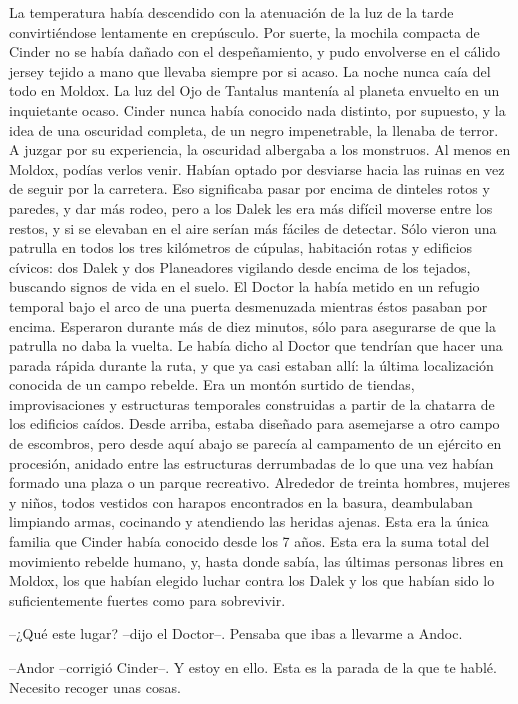 La temperatura había descendido con la atenuación de la luz de la tarde convirtiéndose lentamente en crepúsculo. Por suerte, la mochila compacta de Cinder no se había dañado con el despeñamiento, y pudo envolverse en el cálido jersey tejido a mano que llevaba siempre por si acaso.
La noche nunca caía del todo en Moldox. La luz del Ojo de Tantalus mantenía al planeta envuelto en un inquietante ocaso. Cinder nunca había conocido nada distinto, por supuesto, y la idea de una oscuridad completa, de un negro impenetrable, la llenaba de terror. A juzgar por su experiencia, la oscuridad albergaba a los monstruos. Al menos en Moldox, podías verlos venir.
Habían optado por desviarse hacia las ruinas en vez de seguir por la carretera. Eso significaba pasar por encima de dinteles rotos y paredes, y dar más rodeo, pero a los Dalek les era más difícil moverse entre los restos, y si se elevaban en el aire serían más fáciles de detectar.
Sólo vieron una patrulla en todos los tres kilómetros de cúpulas, habitación rotas y edificios cívicos: dos Dalek y dos Planeadores vigilando desde encima de los tejados, buscando signos de vida en el suelo. El Doctor la había metido en un refugio temporal bajo el arco de una puerta desmenuzada mientras éstos pasaban por encima. Esperaron durante más de diez minutos, sólo para asegurarse de que la patrulla no daba la vuelta.
Le había dicho al Doctor que tendrían que hacer una parada rápida durante la ruta, y que ya casi estaban allí: la última localización conocida de un campo rebelde. Era un montón surtido de tiendas, improvisaciones y estructuras temporales construidas a partir de la chatarra de los edificios caídos. Desde arriba, estaba diseñado para asemejarse a otro campo de escombros, pero desde aquí abajo se parecía al campamento de un ejército en procesión, anidado entre las estructuras derrumbadas de lo que una vez habían formado una plaza o un parque recreativo.
Alrededor de treinta hombres, mujeres y niños, todos vestidos con harapos encontrados en la basura, deambulaban limpiando armas, cocinando y atendiendo las heridas ajenas. Esta era la única familia que Cinder había conocido desde los 7 años. Esta era la suma total del movimiento rebelde humano, y, hasta donde sabía, las últimas personas libres en Moldox, los que habían elegido luchar contra los Dalek y los que habían sido lo suficientemente fuertes como para sobrevivir.

--¿Qué este lugar? --dijo el Doctor--. Pensaba que ibas a llevarme a Andoc.

--Andor --corrigió Cinder--. Y estoy en ello. Esta es la parada de la que te hablé. Necesito recoger unas cosas.

